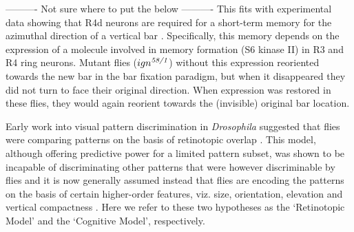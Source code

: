 ----------
Not sure where to put the below
----------
This fits with experimental data showing that R4d neurons are required for a short-term memory for the azimuthal direction of a vertical bar \cite{Neuser2008}.
Specifically, this memory depends on the expression of a molecule involved in memory formation (S6 kinase II) in R3 and R4 ring neurons.
Mutant flies ($ign^{\emph{58/1}}$) without this expression reoriented towards the new bar in the bar fixation paradigm, but when it disappeared they did not turn to face their original direction.
When expression was restored in these flies, they would again reorient towards the (invisible) original bar location.


Early work into visual pattern discrimination in \emph{Drosophila} suggested that flies were comparing patterns on the basis of retinotopic overlap \cite{Dill1995,Dill1993}.
This model, although offering predictive power for a limited pattern subset, was shown to be incapable of discriminating other patterns that were however discriminable by flies \cite{Ernst1999} and it is now generally assumed instead that flies are encoding the patterns on the basis of certain higher-order features, viz. size, orientation, elevation and vertical compactness \cite{Ernst1999,Liu2006,Pan2009}.
Here we refer to these two hypotheses as the `Retinotopic Model' and the `Cognitive Model', respectively.


